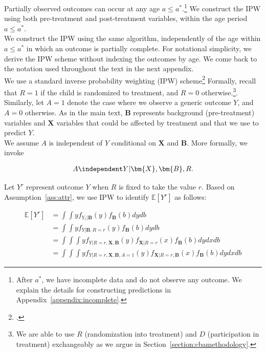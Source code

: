 \noindent Partially observed outcomes can occur at any age $a \leq a^*$.\footnote{After $a^*$, we have incomplete data and do not observe any outcome. We explain the details for constructing predictions in Appendix~\ref{appendix:incomplete}.} We construct the IPW using both pre-treatment and post-treatment variables, within the age period  $a \leq a^*$.\\

\noindent We construct the IPW using the same algorithm, independently of the age within $a \leq a^*$ in which an outcome is partially complete. For notational simplicity, we derive the IPW scheme without indexing the outcomes by age. We come back to the notation used throughout the text in the next appendix.\\

\noindent We use a standard inverse probability weighting (IPW) scheme\footnote{\citet{Horvitz_Thompson_1952_JASA}.} Formally, recall that $R = 1$ if the child is randomized to treatment, and $R = 0$ otherwise.\footnote{We are able to use $R$ (randomization into treatment) and $D$ (participation in treatment) exchangeably as we argue in Section~\ref{section:cbamethodology}.}. Similarly, let $A = 1$ denote the case where we observe a generic outcome $Y$, and $A = 0$ otherwise. As in the main text, $\bm{B}$ represents background (pre-treatment) variables and $\bm{X}$ variables that could be affected by treatment and that we use to predict $Y$.\\

\noindent We assume $A$ is independent of $Y$ conditional on $\bm{X}$ and $\bm{B}$. More formally, we invoke

\begin{assumption} \label{ass:attr}
	\begin{align*}
		A \independent Y | \bm{X}, \bm{B}, R.
	\end{align*}
\end{assumption}

\noindent Let $Y^{r}$ represent outcome $Y$ when $R$ is fixed to take the value $r$. Based on Assumption~\ref{ass:attr}, we use IPW to identify $\mathbb{E}[Y^r]$ as follows:

\begin{align} \label{eq:case2}
\mathbb{E}[Y^r] & = \int \int y f_{ Y_ r| \bm{B} } (y) f_{\bm{B}} (b) dydb \\ \nonumber
	           & = \int \int y f_{Y| \bm{B}, R=r}(y) f_{\bm{B}} (b) dydb \\ \nonumber
	           & = \int \int \int y f_{Y|R=r,\bm{X}, \bm{B}} (y) f_{\bm{X} | R=r} (x) f_{\bm{B}} (b) dydxdb \\ \nonumber
				& = \int \int \int y f_{Y|R=r,\bm{X}, \bm{B}, A=1} (y) f_{\bm{X} | R=r, \bm{B} }(x) f_{\bm{B}} (b) dydxdb
\end{align}

